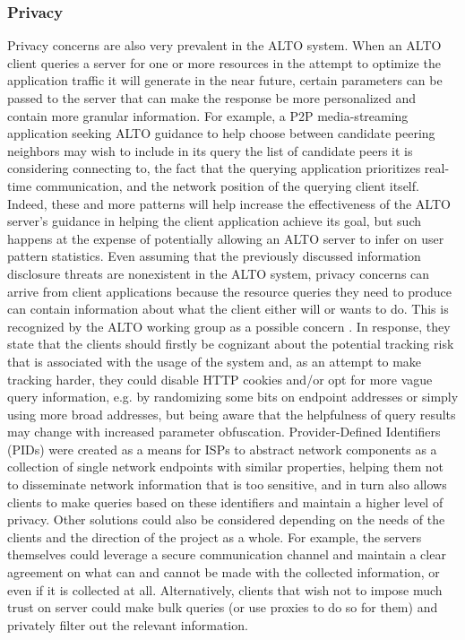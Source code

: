 \subsubsection{Privacy}%

    Privacy concerns are also very prevalent in the ALTO system.
    When an ALTO client queries a server for one or more resources in the attempt to optimize the application traffic it will generate in the near future, certain parameters can be passed to the server that can make the response be more personalized and contain more granular information.
    For example, a P2P media-streaming application seeking ALTO guidance to help choose between candidate peering neighbors may wish to include in its query the list of candidate peers it is considering connecting to, the fact that the querying application prioritizes real-time communication, and the network position of the querying client itself.
    Indeed, these and more patterns will help increase the effectiveness of the ALTO server's guidance in helping the client application achieve its goal, but such happens at the expense of potentially allowing an ALTO server to infer on user pattern statistics.
    Even assuming that the previously discussed information disclosure threats are nonexistent in the ALTO system, privacy concerns can arrive from client applications because the resource queries they need to produce can contain information about what the client either will or wants to do.
    This is recognized by the ALTO working group as a possible concern \cite{alto-protocol} \cite{alto-problem-statement}.
    In response, they state that the clients should firstly be cognizant about the potential tracking risk that is associated with the usage of the system and, as an attempt to make tracking harder, they could disable HTTP cookies and/or opt for more vague query information, e.g. by randomizing some bits on endpoint addresses or simply using more broad addresses, but being aware that the helpfulness of query results may change with increased parameter obfuscation.
    Provider-Defined Identifiers (PIDs) were created as a means for ISPs to abstract network components as a collection of single network endpoints with similar properties, helping them not to disseminate network information that is too sensitive, and in turn also allows clients to make queries based on these identifiers and maintain a higher level of privacy.
    Other solutions could also be considered depending on the needs of the clients and the direction of the project as a whole.
    For example, the servers themselves could leverage a secure communication channel and maintain a clear agreement on what can and cannot be made with the collected information, or even if it is collected at all.
    Alternatively, clients that wish not to impose much trust on server could make bulk queries (or use proxies to do so for them) and privately filter out the relevant information.

